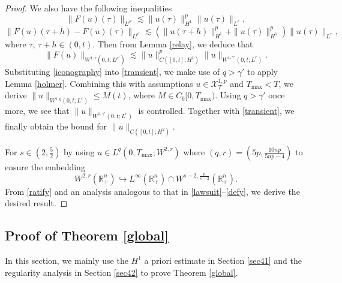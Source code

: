 \documentclass[preprint,compress,12pt]{elsarticle}
\numberwithin{equation}{section}
\begin{document}
\begin{proof}
	We also have the following inequalities
	\begin{equation}
		\|F(u)(\tau)\|_{L^{\rho'}}\lesssim \|u(\tau)\|_{H^{1}}^{p} \|u(\tau)\|_{L^{r}},
	\end{equation}
	\begin{equation}
		\|F(u)(\tau+h)-F(u)(\tau)\|_{L^{\rho'}}\lesssim \left(\|u(\tau+h)\|_{H^{1}}^{p}+\|u(\tau)\|_{H^{1}}^{p}\right) \|u(\tau)\|_{L^{r}},
	\end{equation}		
	where $\tau$, $\tau+h\in(0,t)$. Then from Lemma \ref{relay}, we deduce that
	\begin{equation}\label{iconography}
		\|F(u)\|_{W^{1,\gamma}(0,t;L^{\rho'})}\lesssim \|u\|_{C([0,t];H^{1})}^{p} \|u\|_{W^{1,\gamma'}(0,t;L^{r})}.
	\end{equation}
	Substituting \eqref{iconography} into \eqref{transient}, we make use of $q>\gamma'$ to apply Lemma \ref{holmer}. Combining this with assumptions $u\in\mathscr{X}^{1,p}_{T}$ and $T_{\max}<T$,  we derive $\|u\|_{W^{1,q}(0,t;L^{r})}\leq M(t)$, where $M\in C_{b}[0,T_{\max})$. Using $q>\gamma'$ once more, we see that $\|u\|_{W^{1,\gamma'}(0,t;L^{r})}$ is controlled. Together with \eqref{transient}, we finally obtain the  bound for $\|u\|_{C([0,t];H^{2})}$.
	
	For $s\in \left(2,\frac{5}{2}\right)$ by using $u\in L^{q}\left(0,T_{\max};W^{2,r}\right)$ where $(q,r)=\left(5p,\frac{10np}{5np-4}\right)$ to ensure the embedding
	\[W^{2,r}(\mathbb{R}_{+}^{n})\hookrightarrow L^{\infty}(\mathbb{R}_{+}^{n})\cap W^{s-2,\frac{n}{s-2}}(\mathbb{R}_{+}^{n}).\]
	From \eqref{ratify} and an analysis analogous to that in \eqref{lawsuit}--\eqref{defy}, we derive the desired result.
\end{proof}
\subsection{Proof of Theorem \ref{global}}
In this section, we mainly use the $H^{1}$ a priori estimate in Section \ref{sec41} and the regularity analysis in Section \ref{sec42} to prove Theorem \ref{global}.
\end{document}
